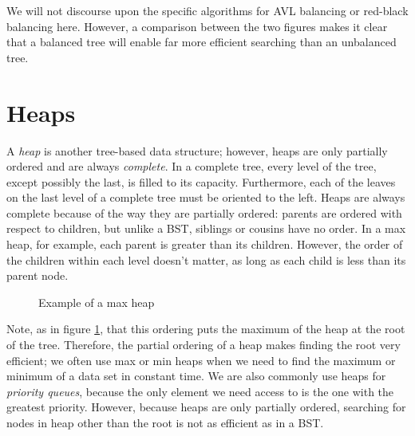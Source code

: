 We will not discourse upon the specific algorithms for AVL balancing or red-black balancing here.
However, a comparison between the two figures makes it clear that a balanced tree will enable far more efficient searching than an unbalanced tree.

\section*{Heaps}
A \emph{heap} is another tree-based data structure; however, heaps are only partially ordered and are always \emph{complete}.
In a complete tree, every level of the tree, except possibly the last, is filled to its capacity.
Furthermore, each of the leaves on the last level of a complete tree must be oriented to the left.
Heaps are always complete because of the way they are partially ordered: parents are ordered with respect to children, but unlike a BST, siblings or cousins have no order.
In a max heap, for example, each parent is greater than its children.
However, the order of the children within each level doesn't matter, as long as each child is less than its parent node.
\begin{figure}[h]
\begin{centering}
\end{centering}
\caption{Example of a max heap}
\label{fig:Max Heap}
\end{figure}
Note, as in figure \ref{fig:Max Heap}, that this ordering puts the maximum of the heap at the root of the tree.
Therefore, the partial ordering of a heap makes finding the root very efficient; we often use max or min heaps when we need to find the maximum or minimum of a data set in constant time.
We are also commonly use heaps for \emph{priority queues}, because the only element we need access to is the one with the greatest priority.
However, because heaps are only partially ordered, searching for nodes in heap other than the root is not as efficient as in a BST.

